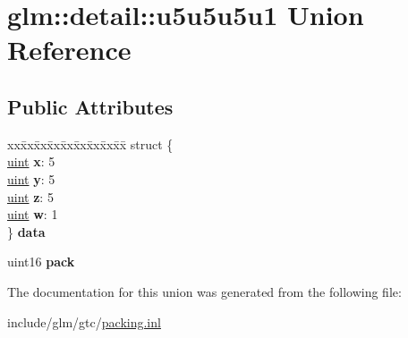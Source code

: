 \hypertarget{unionglm_1_1detail_1_1u5u5u5u1}{}\section{glm\+:\+:detail\+:\+:u5u5u5u1 Union Reference}
\label{unionglm_1_1detail_1_1u5u5u5u1}
\subsection*{Public Attributes}
\begin{DoxyCompactItemize}
\item 
\mbox{\label{unionglm_1_1detail_1_1u5u5u5u1_a22d17eb5ead264ae4d99e3beff2ed1a9}} 
\begin{tabbing}
xx\=xx\=xx\=xx\=xx\=xx\=xx\=xx\=xx\=\kill
struct \{\\
\>\hyperlink{group__core__precision_ga4fd29415871152bfb5abd588334147c8}{uint} {\bfseries x}: 5\\
\>\hyperlink{group__core__precision_ga4fd29415871152bfb5abd588334147c8}{uint} {\bfseries y}: 5\\
\>\hyperlink{group__core__precision_ga4fd29415871152bfb5abd588334147c8}{uint} {\bfseries z}: 5\\
\>\hyperlink{group__core__precision_ga4fd29415871152bfb5abd588334147c8}{uint} {\bfseries w}: 1\\
\} {\bfseries data}\\

\end{tabbing}\item 
\mbox{\label{unionglm_1_1detail_1_1u5u5u5u1_acbc99680c58046aeb5c4f2b284680a8b}} 
uint16 {\bfseries pack}
\end{DoxyCompactItemize}


The documentation for this union was generated from the following file\+:\begin{DoxyCompactItemize}
\item 
include/glm/gtc/\hyperlink{packing_8inl}{packing.\+inl}\end{DoxyCompactItemize}
